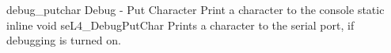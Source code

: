 %
%
%

\apidoc
{debug_putchar}
{Debug - Put Character}
{Print a character to the console}
{static inline void seL4\_DebugPutChar}
{
}
{\noret}
{Prints a character to the serial port, if debugging is turned on.}
